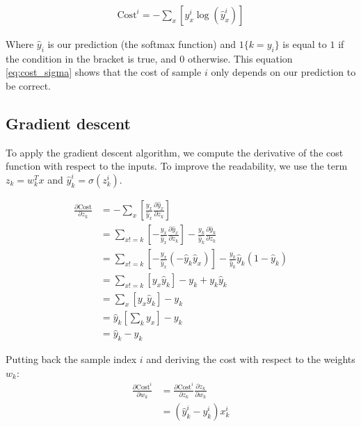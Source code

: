 		\begin{equation} \label{eq:cost_sigma}
			\begin{split}
				\text{Cost}^i = - \sum_x \left[ y^i_x \log (\hat{y}^i_x) \right]
			\end{split}
		\end{equation}

		Where $\hat{y}_i$ is our prediction (the softmax function) and $1\{k=y_i\}$ is equal to $1$ if the condition in the bracket is true, and $0$ otherwise. This equation \ref{eq:cost_sigma} shows that the cost of sample $i$ only depends on our prediction to be correct. 

	\subsection{Gradient descent}
		To apply the gradient descent algorithm, we compute the derivative of the cost function with respect to the inputs. To improve the readability, we use the term $z_k = w_k^T x$ and $\hat{y}^i_k = \sigma(z^i_{k})$.

		\begin{equation} \label{eq:grad_cost_sigma}
			\begin{split}
				\frac{\partial \text{Cost}}{\partial z_k}
				&= - \sum_x \left[ \frac{y_x}{\hat{y}_x} \frac{\partial \hat{y}_x}{\partial z_k} \right]  \\
				&= \sum_{x!=k} \left[ - \frac{y_x}{\hat{y}_x} \frac{\partial \hat{y}_x}{\partial z_k} \right]  - \frac{y_k}{\hat{y}_{k}} \frac{\partial \hat{y}_k}{\partial z_k} \\
				&= \sum_{x!=k} \left[ - \frac{y_x}{\hat{y}_x} (-\hat{y}_k \hat{y}_x) \right]  - \frac{y_k}{\hat{y}_k} \hat{y}_k (1 - \hat{y}_k) \\
				&= \sum_{x!=k} \left[ y_x \hat{y}_k \right]  - y_k + y_k \hat{y}_k \\
				&= \sum_x \left[ y_x \hat{y}_k \right]  - y_k \\
				&= \hat{y}_k \left[ \sum_k y_x \right]  - y_k \\
				&= \hat{y}_k - y_k
			\end{split}
		\end{equation}

		Putting back the sample index $i$ and deriving the cost with respect to the weights $w_k$:
		\begin{equation} \label{eq:grad_cost_sigma_w}
			\begin{split}
				\frac{\partial \text{Cost}^i}{\partial w_k}
				&= \frac{\partial \text{Cost}^i}{\partial z_k} \frac{\partial z_k}{\partial w_k} \\
				&= (\hat{y}^i_k - y^i_k) x^i_k \\
			\end{split}
		\end{equation}



